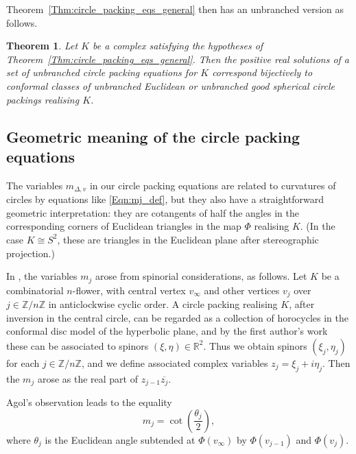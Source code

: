 \documentclass[12pt]{amsart}
\numberwithin{equation}{section}
\newtheorem{theorem}[equation]{Theorem}
\theoremstyle{named}
\newcommand{\refeqn}[1]{\eqref{Eqn:#1}}
\newcommand{\refthm}[1]{Theorem~\ref{Thm:#1}}
\newcommand{\R}{\mathbb{R}}
\newcommand{\Z}{\mathbb{Z}}
\begin{document}
 \refthm{circle_packing_eqs_general} then has an unbranched version as follows. 


\begin{theorem}
\label{Thm:circle_packing_eqs_general_unbranched}
Let $K$ be a complex satisfying the hypotheses of \refthm{circle_packing_eqs_general}. Then the positive real solutions of a set of unbranched circle packing equations for $K$ correspond bijectively to conformal classes of unbranched Euclidean or unbranched good spherical circle packings realising $K$.
\end{theorem}

\subsection{Geometric meaning of the circle packing equations}

The variables $m_{\Delta,v}$ in our circle packing equations are related to curvatures of circles by equations like \refeqn{mj_def}, but they also have a straightforward geometric interpretation: they are cotangents of half the angles in the corresponding corners of Euclidean triangles in the map $\Phi$ realising $K$. (In the case $K \cong S^2$, these are triangles in the Euclidean plane after stereographic projection.)

In \cite{MZ25}, the variables $m_j$ arose from spinorial considerations, as follows. Let $K$ be a combinatorial $n$-flower, with central vertex $v_\infty$ and other vertices $v_j$ over $j \in \Z/n\Z$ in anticlockwise cyclic order. A circle packing realising $K$, after inversion in the central circle, can be regarded as a collection of horocycles in the conformal disc model of the hyperbolic plane, and by the first author's work \cite{M_spinors_horospheres} these can be associated to spinors $(\xi, \eta) \in \R^2$. Thus we obtain spinors $(\xi_j, \eta_j)$ for each $j \in \Z/n\Z$, and we define associated complex variables $z_j = \xi_j + i \eta_j$. Then the $m_j$ arose as the real part of $z_{j-1} \overline{z_j}$.

Agol's observation \cite{Agol_email} leads to the equality
\[
m_j = \cot \left( \frac{\theta_j}{2} \right),
\]
where $\theta_j$ is the Euclidean angle subtended at $\Phi(v_\infty)$ by $\Phi(v_{j-1})$ and $\Phi(v_j)$.
\end{document}

